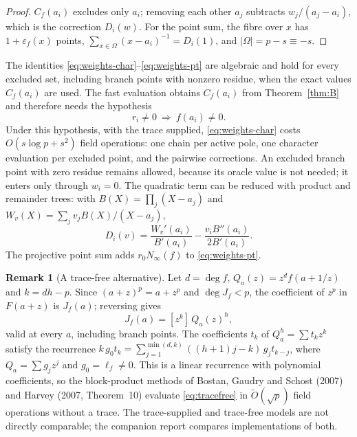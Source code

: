 \documentclass[11pt,a4paper]{article}
\numberwithin{equation}{section}
\theoremstyle{plain}
\theoremstyle{definition}
\newtheorem{remark}[theorem]{Remark}
\newcommand{\eps}{\varepsilon}
\begin{document}
\begin{proof}
$C_f(a_i)$ excludes only $a_i$; removing each other $a_j$ subtracts $w_j/(a_j-a_i)$, which is the correction $D_i(w)$. For the point sum, the fibre over $x$ has $1+\eps_f(x)$ points, $\sum_{x\in\Omega}(x-a_i)^{-1}=D_i(1)$, and $|\Omega|=p-s\equiv-s$.
\end{proof}

The identities \eqref{eq:weights-char}--\eqref{eq:weights-pt} are algebraic and hold for every excluded set, including branch points with nonzero residue, when the exact values $C_f(a_i)$ are used. The fast evaluation obtains $C_f(a_i)$ from Theorem~\ref{thm:B} and therefore needs the hypothesis
\[
r_i\neq0\ \Longrightarrow\ f(a_i)\neq0 .
\]
Under this hypothesis, with the trace supplied, \eqref{eq:weights-char} costs $O(s\log p+s^2)$ field operations: one chain per active pole, one character evaluation per excluded point, and the pairwise corrections. An excluded branch point with zero residue remains allowed, because its oracle value is not needed; it enters only through $w_i=0$. The quadratic term can be reduced with product and remainder trees: with $B(X)=\prod_j(X-a_j)$ and $W_v(X)=\sum_jv_jB(X)/(X-a_j)$,
\begin{equation}\label{eq:fastD}
D_i(v)=\frac{W_v'(a_i)}{B'(a_i)}-\frac{v_iB''(a_i)}{2B'(a_i)} .
\end{equation}
The projective point sum adds $r_0N_\infty(f)$ to \eqref{eq:weights-pt}.

\begin{remark}[A trace-free alternative]\label{rem:tracefree}
Let $d=\deg f$, $Q_a(z)=z^df(a+1/z)$ and $k=dh-p$. Since $(a+z)^p=a+z^p$ and $\deg J_f<p$, the coefficient of $z^p$ in $F(a+z)$ is $J_f(a)$; reversing gives
\begin{equation}\label{eq:tracefree}
J_f(a)=[z^k]\,Q_a(z)^h,
\end{equation}
valid at every $a$, including branch points. The coefficients $t_k$ of $Q_a^h=\sum t_kz^k$ satisfy the recurrence $k\,g_0t_k=\sum_{j=1}^{\min(d,k)}((h+1)j-k)\,g_jt_{k-j}$, where $Q_a=\sum g_jz^j$ and $g_0=\ell_f\neq0$. This is a linear recurrence with polynomial coefficients, so the block-product methods of Bostan, Gaudry and Schost (2007) and Harvey (2007, Theorem~10) evaluate \eqref{eq:tracefree} in $\widetilde O(\sqrt p)$ field operations without a trace. The trace-supplied and trace-free models are not directly comparable; the companion report compares implementations of both.
\end{remark}
\end{document}
